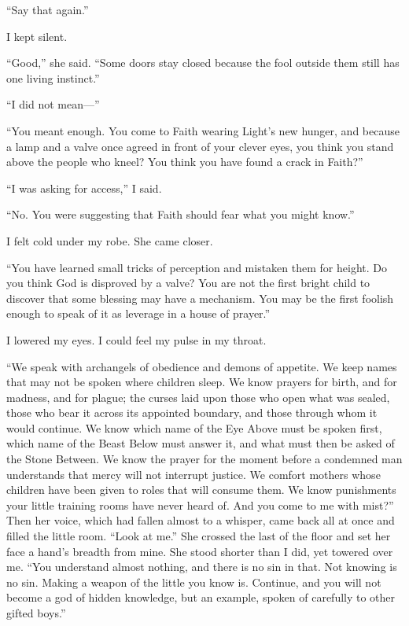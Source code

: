 ``Say that again.''\par
I kept silent.\par
``Good,'' she said. ``Some doors stay closed because the fool outside them still has one living instinct.''\par
``I did not mean---''\par
``You meant enough. You come to Faith wearing Light's new hunger, and because a lamp and a valve once agreed in front of your clever eyes, you think you stand above the people who kneel? You think you have found a crack in Faith?''\par
``I was asking for access,'' I said.\par
``No. You were suggesting that Faith should fear what you might know.''\par
I felt cold under my robe. She came closer.\par
``You have learned small tricks of perception and mistaken them for height. Do you think God is disproved by a valve? You are not the first bright child to discover that some blessing may have a mechanism. You may be the first foolish enough to speak of it as leverage in a house of prayer.''\par
I lowered my eyes. I could feel my pulse in my throat.\par
``We speak with archangels of obedience and demons of appetite. We keep names that may not be spoken where children sleep. We know prayers for birth, and for madness, and for plague; the curses laid upon those who open what was sealed, those who bear it across its appointed boundary, and those through whom it would continue. We know which name of the Eye Above must be spoken first, which name of the Beast Below must answer it, and what must then be asked of the Stone Between. We know the prayer for the moment before a condemned man understands that mercy will not interrupt justice. We comfort mothers whose children have been given to roles that will consume them. We know punishments your little training rooms have never heard of. And you come to me with mist?'' Then her voice, which had fallen almost to a whisper, came back all at once and filled the little room. ``Look at me.'' She crossed the last of the floor and set her face a hand's breadth from mine. She stood shorter than I did, yet towered over me. ``You understand almost nothing, and there is no sin in that. Not knowing is no sin. Making a weapon of the little you know is. Continue, and you will not become a god of hidden knowledge, but an example, spoken of carefully to other gifted boys.''\par

